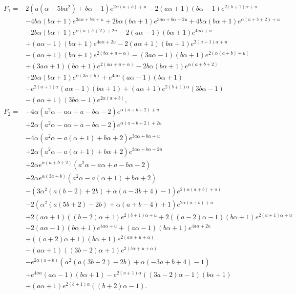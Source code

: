 \begin{align*}
    F_1 =& 2 \left(a \left(\alpha-5 b \alpha^2\right)+b \alpha-1\right) e^{2 \alpha (a+b)+u}-2 (a \alpha+1) (b \alpha-1) e^{2 (b+1) \alpha+u} \\
    & -4 b \alpha (b \alpha+1) e^{3 a \alpha+b \alpha+u} +2 b \alpha (b \alpha+1) e^{3 a \alpha+b \alpha+2 u}+4 b \alpha (b \alpha+1) e^{\alpha (a+b+2)+u} \\
    &-2 b \alpha (b \alpha+1) e^{\alpha (a+b+2)+2 u} -2 (a \alpha-1) (b \alpha+1) e^{4 a \alpha+u} \\
    &+(a \alpha-1) (b \alpha+1) e^{4 a \alpha+2 u}-2 (a \alpha+1) (b \alpha+1) e^{2 (a+1) \alpha+u} \\
    &-(a \alpha+1) (b \alpha+1) e^{2 (b \alpha+u+\alpha)}-(3 a \alpha-1) (b \alpha+1) e^{2 (\alpha (a+b)+u)} \\
    &+(3 a \alpha+1) (b \alpha+1) e^{2 (a \alpha+u+\alpha)}-2 b \alpha (b \alpha+1) e^{\alpha (a+b+2)} \\
    &+2 b \alpha (b \alpha+1) e^{\alpha (3 a+b)} +e^{4 a \alpha} (a \alpha-1) (b \alpha+1) \\
    &-e^{2 (a+1) \alpha} (a \alpha-1) (b \alpha+1)+(a \alpha+1) e^{2 (b+1) \alpha} (3 b \alpha-1) \\
    &-(a \alpha+1) (3 b \alpha-1) e^{2 \alpha (a+b)}, \\
    F_2 =& -4 \alpha \left(a^2 \alpha-a \alpha+a-b \alpha-2\right) e^{\alpha (a+b+2)+u} \\
    &+2 \alpha \left(a^2 \alpha-a \alpha+a-b \alpha-2\right) e^{\alpha (a+b+2)+2 u} \\
    &-4 \alpha \left(a^2 \alpha-a (\alpha+1)+b \alpha+2\right) e^{3 a \alpha+b \alpha+u} \\
    &+2 \alpha \left(a^2 \alpha-a (\alpha+1)+b \alpha+2\right) e^{3 a \alpha+b \alpha+2 u} \\
    &+2 \alpha e^{\alpha (a+b+2)} \left(a^2 \alpha-a \alpha+a-b \alpha-2\right) \\
    &+2 \alpha e^{\alpha (3 a+b)} \left(a^2 \alpha-a (\alpha+1)+b \alpha+2\right) \\
    &-\left(3 \alpha^2 (a (b-2)+2 b)+\alpha (a-3 b+4)-1\right) e^{2 (\alpha (a+b)+u)} \\
    &-2 \left(\alpha^2 (a (5 b+2)-2 b)+\alpha (a+b-4)+1\right) e^{2 \alpha (a+b)+u} \\
    &+2 (a \alpha+1) ((b-2) \alpha+1) e^{2 (b+1) \alpha+u}+2 ((a-2) \alpha-1) (b \alpha+1) e^{2 (a+1) \alpha+u} \\
    &-2 (a \alpha-1) (b \alpha+1) e^{4 a \alpha+u}+(a \alpha-1) (b \alpha+1) e^{4 a \alpha+2 u} \\
    &+((a+2) \alpha+1) (b \alpha+1) e^{2 (a \alpha+u+\alpha)} \\
    &-(a \alpha+1) ((3 b-2) \alpha+1) e^{2 (b \alpha+u+\alpha)} \\
    &-e^{2 \alpha (a+b)} \left(\alpha^2 (a (3 b+2)-2 b)+\alpha (-3 a+b+4)-1\right) \\
    &+e^{4 a \alpha} (a \alpha-1) (b \alpha+1)-e^{2 (a+1) \alpha} ((3 a-2) \alpha-1) (b \alpha+1) \\
    &+(a \alpha+1) e^{2 (b+1) \alpha} ((b+2) \alpha-1).
\end{align*}
\newpage
